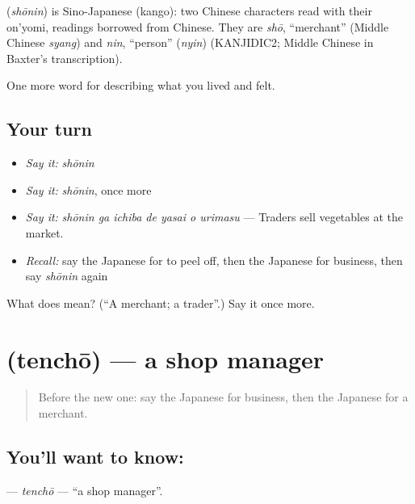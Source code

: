 \begin{cousinweb}
\textbf{} (\emph{shōnin}) is Sino-Japanese (kango): two Chinese characters read with their on'yomi, readings borrowed from Chinese. They are \emph{shō}, \textquotedblleft{}merchant\textquotedblright{} (Middle Chinese \emph{syang}) and \emph{nin}, \textquotedblleft{}person\textquotedblright{} (\emph{nyin}) (KANJIDIC2; Middle Chinese in Baxter's transcription).
\end{cousinweb}

\begin{grammarlens}[title={What you've built}]
One more word for describing what you lived and felt.
\end{grammarlens}

\subsection*{Your turn}
\begin{itemize}
\raggedright
  \item \emph{Say it:} \emph{shōnin}
  \item \emph{Say it:} \emph{shōnin}, once more
  \item \emph{Say it:} \emph{shōnin ga ichiba de yasai o urimasu} — Traders sell vegetables at the market.
  \item \emph{Recall:} say the Japanese for to peel off, then the Japanese for business, then say \emph{shōnin} again
\end{itemize}

\begin{tcolorbox}[breakable,colback=teal!4,colframe=teal!35!black,title={Before you move on}]
What does  mean? (\textquotedblleft{}A merchant; a trader\textquotedblright{}.) Say it once more.
\end{tcolorbox}
\section[\texorpdfstring{\ja{てんちょう} (tenchō)}{てんちょう (tenchō)}]{ (tenchō) — a shop manager}

\label{lesson:JA-C487-tenchou}



\begin{quote}
Before the new one: say the Japanese for business, then the Japanese for a merchant.
\end{quote}

\subsection*{You'll want to know: }
\textbf{} — \emph{tenchō} — \textquotedblleft{}a shop manager\textquotedblright{}.

